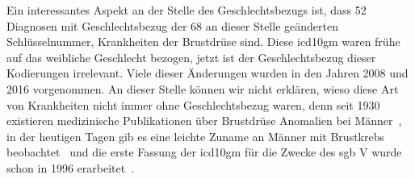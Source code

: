 Ein interessantes Aspekt an der Stelle des Geschlechtsbezugs ist, dass \textsf{52} Diagnosen mit Geschlechtsbezug der \textsf{68} an dieser Stelle geänderten Schlüsselnummer, Krankheiten der Brustdrüse sind. Diese \ac{icd10gm} waren frühe auf das weibliche Geschlecht bezogen, jetzt ist der Geschlechtsbezug dieser Kodierungen irrelevant. Viele dieser Änderungen wurden in den Jahren 2008 und 2016 vorgenommen. An dieser Stelle können wir nicht erklären, wieso diese Art von Krankheiten nicht immer ohne Geschlechtsbezug waren, denn seit 1930 existieren medizinische Publikationen über Brustdrüse Anomalien bei Männer~\cite{bcm}, in der heutigen Tagen gib es eine leichte Zuname an Männer mit Brustkrebs beobachtet~\cite{giobcm} und die erste Fassung der \ac{icd10gm} für die Zwecke des \ac{sgb} V wurde schon in 1996 erarbeitet~\cite{icdgmhistory}.

\clearpage

